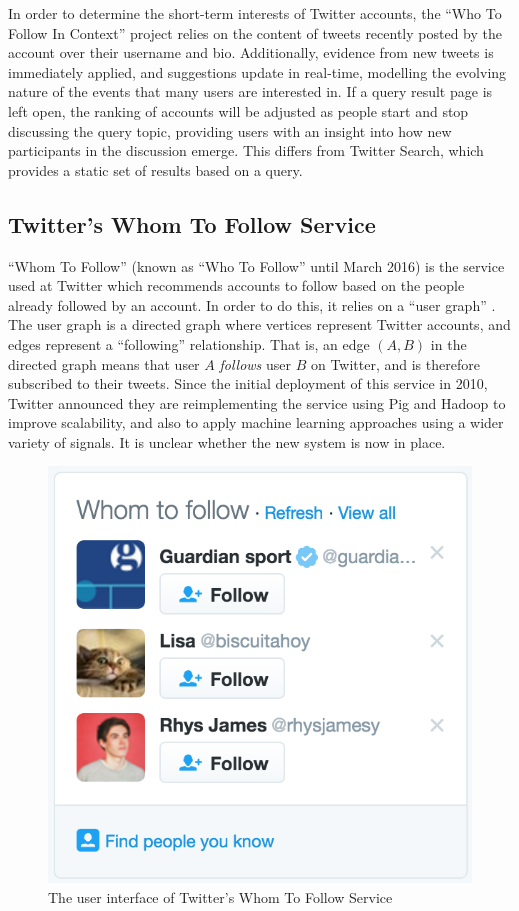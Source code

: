 \documentclass{l4proj}
\begin{document}
In order to determine the short-term interests of Twitter accounts, the ``Who To Follow In Context'' project relies on the content of tweets recently posted by the account over their username and bio. Additionally,
evidence from new tweets is immediately applied, and suggestions update in real-time, modelling the evolving nature of the events that many users are interested in. If a query result page is left open, the ranking of accounts will be adjusted as people start and stop discussing the query topic, providing users with an insight into how new participants in the discussion emerge. This differs from Twitter Search, which provides a static set of results based on a query.

\subsection{Twitter's Whom To Follow Service}
``Whom To Follow'' (known as ``Who To Follow'' until March 2016) is the service used at Twitter which recommends accounts to follow based on the people already followed by an account. In order to do this, it relies on a ``user graph'' \cite{twitterWTF}. The user graph is a directed graph where vertices represent Twitter accounts, and edges represent a ``following'' relationship. That is, an edge $(A, B)$ in the directed graph means that user $A$ \textit{follows} user $B$ on Twitter, and is therefore subscribed to their tweets. Since the initial deployment of this service in 2010, Twitter announced they are reimplementing the service using Pig and Hadoop to improve scalability, and also to apply machine learning approaches using a wider variety of signals. It is unclear whether the new system is now in place.

\begin{figure}[H]
\centering
\includegraphics[scale=0.75]{whomtofollow.png}
\caption{The user interface of Twitter's Whom To Follow Service}
\label{whomtofollow}
\end{figure}
\end{document}

